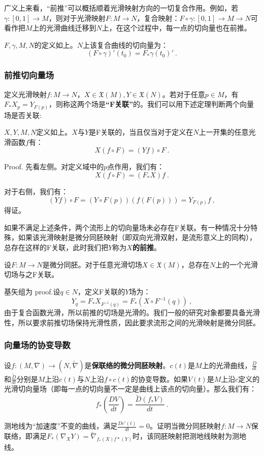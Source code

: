 广义上来看，“前推”可以概括顺着光滑映射方向的一切复合作用。例如，若$\gamma:[0,1]\rightarrow M$，则对于光滑映射$F:M\rightarrow N$，复合映射：$F\circ \gamma:[0,1]\rightarrow M\rightarrow N$可看作把$M$上的光滑曲线迁移到$N$上，在这个过程中，每一点的切向量也在前推。
\begin{lemma}{}
$F,\gamma,M,N$的定义如上。$N$上该复合曲线的切向量为：
\begin{equation}
(F\circ\gamma)'(t_0)=F_*\gamma(t_0)'~.
\end{equation}
\end{lemma}
\subsubsection{前推切向量场}
定义光滑映射$f:M\rightarrow N$，$X \in \mathfrak{X
}(M),Y\in \mathfrak{X}(N)$。若对于任意$p\in M$，有$F_*X_p=Y_{F(p)}$，则称这两个场是\textbf{“F关联”}的。我们可以用下述定理判断两个向量场是否关联:
\begin{theorem}{}
$X,Y,M,N$定义如上。$X$与$Y$是F关联的，当且仅当对于定义在$N$上一开集的任意光滑函数$f$有：
\begin{equation}
X(f\circ F)=(Yf)\circ F~.
\end{equation}
\end{theorem}
Proof.
先看左侧。对定义域中的$p$点作用，我们有：
\begin{equation}
X(f\circ F)=(F_*X)f~.
\end{equation}

对于右侧，我们有：
\begin{equation}
(Yf)\circ F=(Y\circ F(p))(f (F(p)))=Y_{F(p)}f~,
\end{equation}
得证。

如果不满足上述条件，两个流形上的切向量场未必存在F关联。有一种情况十分特殊，如果该光滑映射是微分同胚映射（即双向光滑双射，是流形意义上的同构），总存在这样的F关联，此时我们把$Y$称为\textbf{$X$的前推}。
\begin{theorem}{}
设$F:M\rightarrow N$是微分同胚。对于任意光滑切场$X\in \mathfrak{X}(M)$，总存在$N$上的一个光滑切场与之F关联。
\end{theorem}
基矢组为
proof.设$q\in N$，定义F关联的$Y$场为：
\begin{equation}
Y_q=F_*X_{F^{-1}(q)}=F_*(X\circ F^{-1}(q))~,
\end{equation}
由于复合函数光滑，所以前推的切场是光滑的。我们一般的研究对象都要具备光滑性，所以要求前推切场保持光滑性质，因此要求流形之间的光滑映射是微分同胚。
\subsubsection{向量场的协变导数}
设$f:(M,\nabla)\rightarrow(N,\widetilde {\nabla})$是\textbf{保联络的微分同胚映射}。$c(t)$是$M$上的光滑曲线，$\frac{D}{dt}$和$\frac{\widetilde D}{dt}$分别是$M$上沿$c(t)$与$N$上沿$f\circ  c(t)$的协变导数。如果$V(t)$是$M$上沿$c$定义的光滑切向量场（即每一点的切向量不一定是曲线上该点的切向量）。那么我们有：
\begin{equation}
f_*(\frac{DV}{dt})=\frac{\widetilde D(f_*V)}{dt}~.
\end{equation}



\begin{exercise}{}
测地线为“加速度”不变的曲线，满足$\frac{Dc'(t)}{dt}=0$。证明当微分同胚映射$f:M\rightarrow N$保联络，即满足$F_*(\nabla_X Y)=\widetilde \nabla_{f_*(X)f*(Y)}$时，该同胚映射把测地线映射为测地线。
\end{exercise}